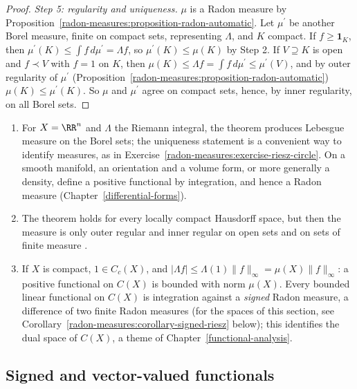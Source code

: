 \begin{proof}
\emph{Step 5: regularity and uniqueness.} $\mu$ is a Radon measure by Proposition~\ref{radon-measures:proposition-radon-automatic}. Let $\mu^{\prime}$ be another Borel measure, finite on compact sets,
representing $\Lambda$, and $K$ compact. If $f \geq \mathbf{1}_K$, then $\mu^{\prime}(K) \leq \int f\,d\mu^{\prime} = \Lambda f$, so $\mu^{\prime}(K) \leq \mu(K)$ by Step 2. If $V \supseteq K$ is open and
$f \prec V$ with $f = 1$ on $K$, then $\mu(K) \leq \Lambda f = \int f\,d\mu^{\prime} \leq \mu^{\prime}(V)$, and by outer regularity of $\mu^{\prime}$
(Proposition~\ref{radon-measures:proposition-radon-automatic}) $\mu(K) \leq \mu^{\prime}(K)$. So $\mu$ and $\mu^{\prime}$ agree on compact sets, hence, by inner regularity, on all Borel sets.
\end{proof}

\begin{remark}\label{radon-measures:remark-riesz-markov}
\begin{enumerate}
\item For $X = \RR^n$ and $\Lambda$ the Riemann integral, the theorem produces Lebesgue measure on the Borel sets; the uniqueness statement is a convenient way to identify measures, as in
Exercise~\ref{radon-measures:exercise-riesz-circle}. On a smooth manifold, an orientation and a volume form, or more generally a density, define a positive functional by integration, and hence a
Radon measure (Chapter~\ref{differential-forms}).
\item The theorem holds for every locally compact Hausdorff space, but then the measure is only outer regular and inner regular on open sets and on sets of finite measure
\cite[Theorem 2.14 and Theorem 2.18]{rudin-rca}.
\item If $X$ is compact, $1 \in C_c(X)$, and $|\Lambda f| \leq \Lambda(1)\|f\|_\infty = \mu(X)\|f\|_\infty$: a positive functional on $C(X)$ is bounded with norm $\mu(X)$. Every bounded linear functional on
$C(X)$ is integration against a \emph{signed} Radon measure, a difference of two finite Radon measures \cite[Theorem 6.19]{rudin-rca} (for the spaces of this section, see Corollary~\ref{radon-measures:corollary-signed-riesz}
below); this identifies the dual space of $C(X)$, a theme of
Chapter~\ref{functional-analysis}.
\end{enumerate}
\end{remark}

\subsection{Signed and vector-valued functionals}\label{radon-measures:subsection-riesz-vector}

